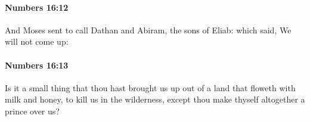		\paragraph{Numbers 16:12} %
			\label{NUMBERS-16-12}

			And Moses sent to call Dathan and Abiram, the sons of Eliab: which said, We will not come up:


		\paragraph{Numbers 16:13} %
			\label{NUMBERS-16-13}

			Is it a small thing that thou hast brought us up out of a land that floweth with milk and honey, to kill us in the wilderness, except thou make thyself altogether a prince over us?


